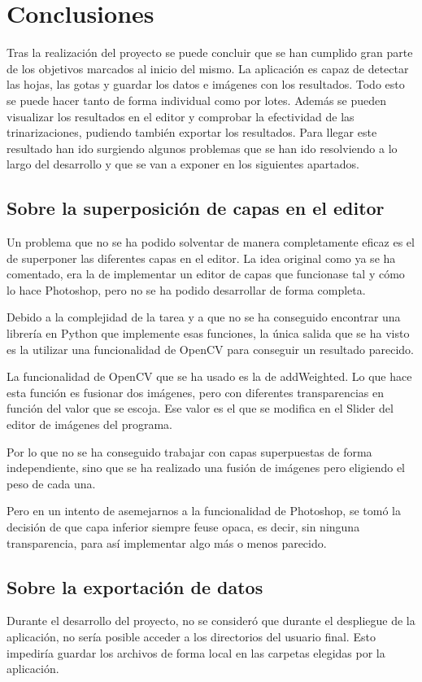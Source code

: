 
\section{Conclusiones}
Tras la realización del proyecto se puede concluir que se han cumplido gran parte de los objetivos marcados al inicio del mismo. La aplicación es capaz de detectar las hojas, las gotas y guardar los datos e imágenes con los resultados. Todo esto se puede hacer tanto de forma individual como por lotes. Además se pueden visualizar los resultados en el editor y comprobar la efectividad de las trinarizaciones, pudiendo también exportar los resultados. Para llegar este resultado han ido surgiendo algunos problemas que se han ido resolviendo a lo largo del desarrollo y que se van a exponer en los siguientes apartados.

\subsection{Sobre la superposición de capas en el editor}
Un problema que no se ha podido solventar de manera completamente eficaz es el de superponer las diferentes capas en el editor. La idea original como ya se ha comentado, era la de implementar un editor de capas que funcionase tal y cómo lo hace Photoshop, pero no se ha podido desarrollar de forma completa.

Debido a la complejidad de la tarea y a que no se ha conseguido encontrar una librería en Python que implemente esas funciones, la única salida que se ha visto es la utilizar una funcionalidad de OpenCV para conseguir un resultado parecido.

La funcionalidad de OpenCV que se ha usado es la de addWeighted. Lo que hace esta función es fusionar dos imágenes, pero con diferentes transparencias en función del valor que se escoja. Ese valor es el que se modifica en el Slider del editor de imágenes del programa.

Por lo que no se ha conseguido trabajar con capas superpuestas de forma independiente, sino que se ha realizado una fusión de imágenes pero eligiendo el peso de cada una. 

Pero en un intento de asemejarnos a la funcionalidad de Photoshop, se tomó la decisión de que capa inferior siempre feuse opaca, es decir, sin ninguna transparencia, para así implementar algo más o menos parecido.

\subsection{Sobre la exportación de datos}
Durante el desarrollo del proyecto, no se consideró que durante el despliegue de la aplicación, no sería posible acceder a los directorios del usuario final. Esto impediría guardar los archivos de forma local en las carpetas elegidas por la aplicación. 

